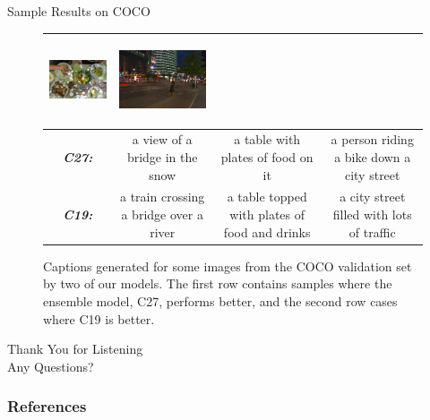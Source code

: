 \documentclass{beamer}
\newcommand{\mcCell}[1]{\multicolumn{1}{|c|}{#1}}
\begin{document}
\begin{frame}{Sample Results on COCO}
\begin{figure}[h]
\begin{center}
{\begin{tabular}{c|c|c|c|}
    \includegraphics[width=0.25\linewidth,height=2.5cm]{images/COCO_val2014_000000218404.jpg} &
    \includegraphics[width=0.25\linewidth,height=2.5cm]{images/COCO_val2014_000000119516.jpg} \\\hline
    \mcCell{\textbf{\em\scriptsize C27:}}& \parbox[c][][c]{0.25\linewidth}{\smallskip \scriptsize a view of a bridge in the snow\smallskip} &
     \parbox[c][][c]{0.25\linewidth}{\smallskip \scriptsize a table with plates of food on it\smallskip}&
     \parbox[c][][c]{0.25\linewidth}{\smallskip \scriptsize a person riding a bike down a city street\smallskip}\\\hline
     \mcCell{\textbf{\em\scriptsize C19:}}& \parbox[c][][c]{0.25\linewidth}{\smallskip \scriptsize a train crossing a bridge over a river\smallskip} &
     \parbox[c][][c]{0.25\linewidth}{\smallskip \scriptsize a table topped with plates of food and drinks\smallskip}&
     \parbox[c][][c]{0.25\linewidth}{\smallskip \scriptsize a city street filled with lots of traffic\smallskip}\\\hline
  \end{tabular}
  }
  \end{center}
  \caption{Captions generated for some images from the COCO validation set by two of our
    models. The first row contains samples where the ensemble model,
    C27, performs better, and the second row cases where C19 is
    better.}
  \label{fig:cococapSamps}
\end{figure}

\end{frame}
\begin{frame}{}
\begin{center}
    \Large Thank You for Listening\\[6mm]
    \Large Any Questions? 
\end{center}
\end{frame}
\begin{frame}[allowframebreaks]
        \frametitle{References}
        
\end{frame}
\end{document}
